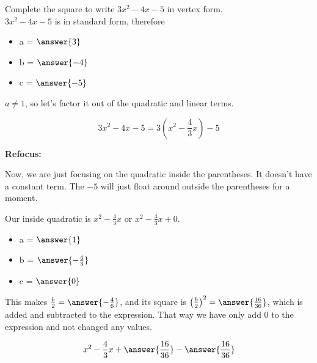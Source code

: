 \documentclass{ximera}
\author{Lee Wayand}
\begin{document}
\begin{exercise} 


Complete the square to write $3x^2 - 4x - 5$ in vertex form. \\



$3x^2 - 4x - 5$ is in standard form, therefore



\begin{itemize}
\item  a = $\answer{3}$ \\
\item  b = $\answer{-4}$ \\
\item  c = $\answer{-5}$ \\
\end{itemize}




$a \ne 1$, so let's factor it out of the quadratic and linear terms.



\[   3x^2 - 4x - 5 = 3 \left( x^2 - \frac{4}{3} x \right) - 5   \]




\begin{procedure} \textbf{Refocus:}  


Now, we are just focusing on the quadratic inside the parentheses.  It doesn't have a constant term.  The $-5$ will just float around outside the parentheses for a moment.



Our inside quadratic is $x^2 - \frac{4}{3} x$ or $x^2 - \frac{4}{3} x + 0$.


\begin{itemize}
\item  a = $\answer{1}$ \\
\item  b = $\answer{-\frac{4}{3}}$ \\
\item  c = $\answer{0}$ \\
\end{itemize}



This makes $\frac{b}{2} = \answer{-\frac{4}{6}}$, and its square is $\left( \frac{b}{2} \right)^2 = \answer{\frac{16}{36}}$, which is added and subtracted to the expression.  That way we have only add $0$ to the expression and not changed any values. 


\[ x^2 - \frac{4}{3} x + \answer{\frac{16}{36}} - \answer{\frac{16}{36}} \]




\end{procedure}
\end{exercise}
\end{document}

